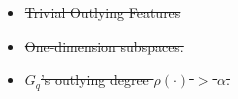 \documentclass[
 size=14pt,
 paper=smartboard,  %
 mode=present, 		%
 display=slides, 	%
 style=tuliplab,  	%
 pauseslide,
 fleqn,leqno]{powerdot}
\providecommand{\DIFdeltex}[1]{{\protect\color{red}\sout{#1}}}                      %
\providecommand{\DIFdelbegin}{} %
\providecommand{\DIFdelend}{} %
\providecommand{\DIFdel}[1]{\texorpdfstring{\DIFdeltex{#1}}{}} %
\newcommand{\DIFscaledelfig}{0.5}
\newlength{\DIFdelgraphicswidth} %
\newlength{\DIFdelgraphicsheight} %
\newcommand{\DIFdelincludegraphics}[2][]{%
\sbox{\DIFdelgraphicsbox}{\DIFOincludegraphics[#1]{#2}}%
\settoboxwidth{\DIFdelgraphicswidth}{\DIFdelgraphicsbox} %
\settoboxtotalheight{\DIFdelgraphicsheight}{\DIFdelgraphicsbox} %
\scalebox{\DIFscaledelfig}{%
\parbox[b]{\DIFdelgraphicswidth}{\usebox{\DIFdelgraphicsbox}\\[-\baselineskip] \rule{\DIFdelgraphicswidth}{0em}}\llap{\resizebox{\DIFdelgraphicswidth}{\DIFdelgraphicsheight}{%
\setlength{\unitlength}{\DIFdelgraphicswidth}%
\begin{picture}(1,1)%
\thicklines\linethickness{2pt} %
{\color[rgb]{1,0,0}\put(0,0){\framebox(1,1){}}}%
{\color[rgb]{1,0,0}\put(0,0){\line( 1,1){1}}}%
{\color[rgb]{1,0,0}\put(0,1){\line(1,-1){1}}}%
\end{picture}%
}\hspace*{3pt}}} %
} %
\DeclareRobustCommand{\DIFdelbegin}{\DIFOdelbegin \let\includegraphics\DIFdelincludegraphics} %
\DeclareRobustCommand{\DIFdelend}{\DIFOaddend \let\includegraphics\DIFOincludegraphics} %
\begin{document}
\DIFdelend %
\DIFdelbegin %
\begin{itemize}%
\item%
\DIFdel{Trivial Outlying Features
}%

\item%
\DIFdel{One-dimension subspaces.
      }%

\item%
\DIFdel{${G_q}$'s outlying degree $\rho(\cdot)$ $>$ $\alpha$.
}
\end{itemize}%
\end{document}
